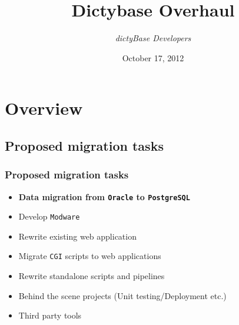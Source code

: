 \documentclass[hyperref={pdfpagelabels=false}, compress]{beamer}
\title{Dictybase Overhaul}
\author{\textit{dictyBase Developers}}
\date{October 17, 2012}
\begin{document}
\frame{\titlepage}



\section{Overview}

\subsection{Proposed migration tasks}
\begin{frame}
	\frametitle{Proposed migration tasks}
	
    	\begin{itemize}
		\item \textbf{Data migration from \texttt{Oracle} to \texttt{PostgreSQL}}
    		\item Develop \texttt{Modware}
    		\item Rewrite existing web application
    		\item Migrate \texttt{CGI} scripts to web applications 
    		\item Rewrite standalone scripts and pipelines
    		\item Behind the scene projects (Unit testing/Deployment etc.)
    		\item Third party tools
	\end{itemize}
\end{frame}
\end{document}
